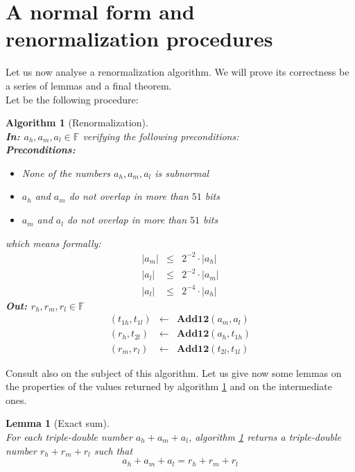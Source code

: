 \documentclass[a4paper,10pt,twoside]{article}
\newtheorem{lemma}[theorem]{Lemma}
\newtheorem{algorithm}[theorem]{Algorithm}
\newcommand{\F}{\ensuremath{\mathbb {F}}}
\newcommand{\hi}{\ensuremath{\mathit{h}}}
\newcommand{\mi}{\ensuremath{\mathit{m}}}
\newcommand{\lo}{\ensuremath{\mathit{l}}}
\newcommand{\mAdd}{\ensuremath{\mathbf{Add12}}}
\begin{document}
\section{A normal form and renormalization procedures}
Let us now analyse a renormalization algorithm. We will prove its
correctness be a series of lemmas and a final theorem. \\
Let be the following procedure:
\begin{algorithm}[Renormalization] \label{renorm}~\\
{\bf In: $a_\hi, a_\mi, a_\lo \in \F$} verifying the following preconditions:\\
{\bf Preconditions: }
\begin{itemize}
\item None of the numbers $a_\hi, a_\mi, a_\lo$ is subnormal
\item $a_\hi$ and $a_\mi$ do not overlap in more than $51$ bits
\item $a_\mi$ and $a_\lo$ do not overlap in more than $51$ bits
\end{itemize}
which means formally:
\begin{eqnarray*}
\left \vert a_\mi \right \vert & \leq & 2^{-2} \cdot \left \vert a_\hi \right \vert \\
\left \vert a_\lo \right \vert & \leq & 2^{-2} \cdot \left \vert a_\mi \right \vert \\
\left \vert a_\lo \right \vert & \leq & 2^{-4} \cdot \left \vert a_\hi \right \vert
\end{eqnarray*}
{\bf Out: $r_\hi, r_\mi, r_\lo \in \F$}
\begin{eqnarray*}
\left(t_{1\hi}, t_{1\lo}\right) & \gets & \mAdd\left(a_\mi,a_\lo\right) \\
\left(r_\hi, t_{2\lo}\right) & \gets & \mAdd\left(a_\hi, t_{1\hi}\right) \\
\left(r_\mi, r_\lo\right) & \gets & \mAdd\left(t_{2\lo}, t_{1\lo}\right)
\end{eqnarray*}
\end{algorithm}
Consult also \cite{Finot-thesis} on the subject of this algorithm.
Let us give now some lemmas on the properties of the values returned by 
algorithm \ref{renorm} and on the intermediate ones.
\begin{lemma}[Exact sum] \label{exact} ~\\
For each triple-double number $a_\hi + a_\mi + a_\lo$, algorithm \ref{renorm} 
returns a triple-double number $r_\hi + r_\mi + r_\lo$ such that
$$a_\hi + a_\mi + a_\lo = r_\hi + r_\mi + r_\lo$$
\end{lemma}
\end{document}
